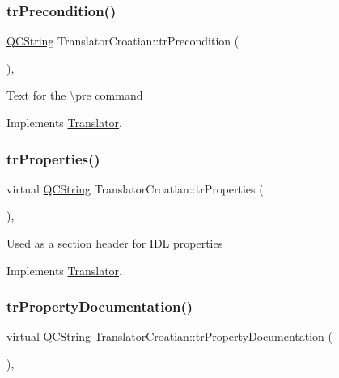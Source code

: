 \subsubsection{\texorpdfstring{trPrecondition()}{trPrecondition()}}
{\footnotesize\ttfamily \mbox{\hyperlink{class_q_c_string}{Q\+C\+String}} Translator\+Croatian\+::tr\+Precondition (\begin{DoxyParamCaption}{ }\end{DoxyParamCaption})\hspace{0.3cm}{\ttfamily [inline]}, {\ttfamily [virtual]}}

Text for the \textbackslash{}pre command 

Implements \mbox{\hyperlink{class_translator}{Translator}}.

\mbox{\label{class_translator_croatian_a3a1b1d5789a54bcf391e4c68a9566b96}} 
\subsubsection{\texorpdfstring{trProperties()}{trProperties()}}
{\footnotesize\ttfamily virtual \mbox{\hyperlink{class_q_c_string}{Q\+C\+String}} Translator\+Croatian\+::tr\+Properties (\begin{DoxyParamCaption}{ }\end{DoxyParamCaption})\hspace{0.3cm}{\ttfamily [inline]}, {\ttfamily [virtual]}}

Used as a section header for I\+DL properties 

Implements \mbox{\hyperlink{class_translator}{Translator}}.

\mbox{\label{class_translator_croatian_ac8e4063363ae2bac4f2defe0d8f369c1}} 
\subsubsection{\texorpdfstring{trPropertyDocumentation()}{trPropertyDocumentation()}}
{\footnotesize\ttfamily virtual \mbox{\hyperlink{class_q_c_string}{Q\+C\+String}} Translator\+Croatian\+::tr\+Property\+Documentation (\begin{DoxyParamCaption}{ }\end{DoxyParamCaption})\hspace{0.3cm}{\ttfamily [inline]}, {\ttfamily [virtual]}}

